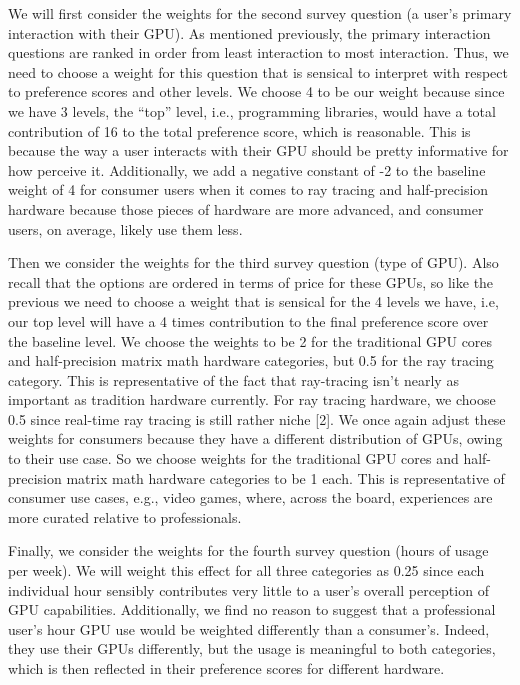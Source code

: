 \documentclass[
]{article}
\begin{document}
We will first consider the weights for the second survey question (a
user's primary interaction with their GPU). As mentioned previously, the
primary interaction questions are ranked in order from least interaction
to most interaction. Thus, we need to choose a weight for this question
that is sensical to interpret with respect to preference scores and
other levels. We choose 4 to be our weight because since we have 3
levels, the ``top'' level, i.e., programming libraries, would have a
total contribution of 16 to the total preference score, which is
reasonable. This is because the way a user interacts with their GPU
should be pretty informative for how perceive it. Additionally, we add a
negative constant of -2 to the baseline weight of 4 for consumer users
when it comes to ray tracing and half-precision hardware because those
pieces of hardware are more advanced, and consumer users, on average,
likely use them less.

Then we consider the weights for the third survey question (type of
GPU). Also recall that the options are ordered in terms of price for
these GPUs, so like the previous we need to choose a weight that is
sensical for the 4 levels we have, i.e, our top level will have a 4
times contribution to the final preference score over the baseline
level. We choose the weights to be 2 for the traditional GPU cores and
half-precision matrix math hardware categories, but 0.5 for the ray
tracing category. This is representative of the fact that ray-tracing
isn't nearly as important as tradition hardware currently. For ray
tracing hardware, we choose 0.5 since real-time ray tracing is still
rather niche {[}2{]}. We once again adjust these weights for consumers
because they have a different distribution of GPUs, owing to their use
case. So we choose weights for the traditional GPU cores and
half-precision matrix math hardware categories to be 1 each. This is
representative of consumer use cases, e.g., video games, where, across
the board, experiences are more curated relative to professionals.

Finally, we consider the weights for the fourth survey question (hours
of usage per week). We will weight this effect for all three categories
as 0.25 since each individual hour sensibly contributes very little to a
user's overall perception of GPU capabilities. Additionally, we find no
reason to suggest that a professional user's hour GPU use would be
weighted differently than a consumer's. Indeed, they use their GPUs
differently, but the usage is meaningful to both categories, which is
then reflected in their preference scores for different hardware.
\end{document}
